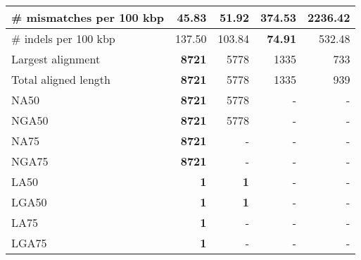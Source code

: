 \documentclass[12pt,a4paper]{article}
\begin{document}
\begin{table}[ht]
\begin{center}
\begin{tabular}{|l*{4}{|r}|}
\# mismatches per 100 kbp & {\bf 45.83} & 51.92 & 374.53 & 2236.42 \\ \hline
\# indels per 100 kbp & 137.50 & 103.84 & {\bf 74.91} & 532.48 \\ \hline
Largest alignment & {\bf 8721} & 5778 & 1335 & 733 \\ \hline
Total aligned length & {\bf 8721} & 5778 & 1335 & 939 \\ \hline
NA50 & {\bf 8721} & 5778 & - & - \\ \hline
NGA50 & {\bf 8721} & 5778 & - & - \\ \hline
NA75 & {\bf 8721} & - & - & - \\ \hline
NGA75 & {\bf 8721} & - & - & - \\ \hline
LA50 & {\bf 1} & {\bf 1} & - & - \\ \hline
LGA50 & {\bf 1} & {\bf 1} & - & - \\ \hline
LA75 & {\bf 1} & - & - & - \\ \hline
LGA75 & {\bf 1} & - & - & - \\ \hline
\end{tabular}
\end{center}
\end{table}
\end{document}
